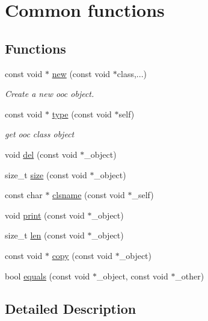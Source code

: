 \hypertarget{group__common}{}\section{Common functions}
\label{group__common}
\subsection*{Functions}
\begin{DoxyCompactItemize}
\item 
const void $\ast$ \mbox{\hyperlink{group__common_ga621d73ced80293aaecd6839e6bdec30d}{new}} (const void $\ast$class,...)
\begin{DoxyCompactList}\small\item\em Create a new ooc object. \end{DoxyCompactList}\item 
const void $\ast$ \mbox{\hyperlink{group__common_ga68940c707bbebe6946aeca72df1ee803}{type}} (const void $\ast$self)
\begin{DoxyCompactList}\small\item\em get ooc class object \end{DoxyCompactList}\item 
void \mbox{\hyperlink{group__common_gae293fe2fbbf9f2e8a87c1141e7412814}{del}} (const void $\ast$\+\_\+object)
\item 
size\+\_\+t \mbox{\hyperlink{group__common_gafac8564ed88a6f8585f043fc6b2fa7e1}{size}} (const void $\ast$\+\_\+object)
\item 
const char $\ast$ \mbox{\hyperlink{group__common_gadcc35aece3f8a4c822a9bf2a591f087b}{clsname}} (const void $\ast$\+\_\+self)
\item 
void \mbox{\hyperlink{group__common_ga34dc6ab72cfd51381e8173226484e827}{print}} (const void $\ast$\+\_\+object)
\item 
size\+\_\+t \mbox{\hyperlink{group__common_ga15be7f4a5b9c979feb83b76278f6716c}{len}} (const void $\ast$\+\_\+object)
\item 
const void $\ast$ \mbox{\hyperlink{group__common_gab08ed4d7b5aa115383f38057e006be9d}{copy}} (const void $\ast$\+\_\+object)
\item 
bool \mbox{\hyperlink{group__common_ga4b83176929aeea62524d2a126d3c897f}{equals}} (const void $\ast$\+\_\+object, const void $\ast$\+\_\+other)
\end{DoxyCompactItemize}


\subsection{Detailed Description}


